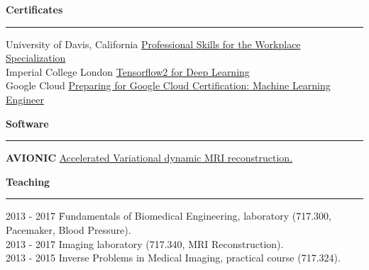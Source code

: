 \vspace{0.7cm}
{\bf Certificates}\\
\noindent\rule{\textwidth}{0.5pt}
\begin{tabbing}
University of Davis, California	\= \href{https://coursera.org/share/05d0094c0f847ddb1e627917b60699c8}{Professional Skills for the Workplace Specialization}  \\
Imperial College London	        \> \href{https://coursera.org/share/924e9fc851e31885190aa7b6e0551d7a}{Tensorflow2 for Deep Learning} \\
Google Cloud	                \> \href{https://coursera.org/share/fe52bc9efdc8290d1b95f8f7a7fe303e}{Preparing for Google Cloud Certification: Machine Learning Engineer}
\end{tabbing}
\bigskip


\vspace{0.7cm}
{\bf Software}\\
\noindent\rule{\textwidth}{0.5pt}
\begin{tabbing}
	\textbf{AVIONIC} \=  \href{https://gitlab.tugraz.at/ibi/mrirecon/software/AVIONIC}{Accelerated Variational dynamic MRI reconstruction.} \\
\end{tabbing}
\bigskip

\vspace{0.7cm}
{\bf Teaching}\\
\noindent\rule{\textwidth}{0.5pt}
\begin{tabbing}
2013 - 2017 \= Fundamentals of Biomedical Engineering, laboratory (717.300, Pacemaker, Blood Pressure).\\
2013 - 2017 \> Imaging laboratory (717.340, MRI Reconstruction).\\
2013 - 2015 \> Inverse Problems in Medical Imaging, practical course (717.324).
\end{tabbing}
\bigskip

